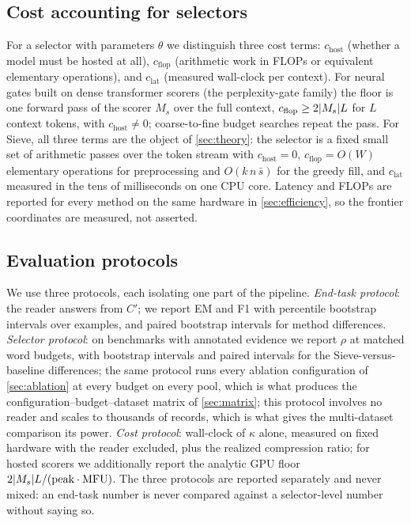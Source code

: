\documentclass[preprint,12pt]{elsarticle}
\DeclarePairedDelimiter\abs{\lvert}{\rvert}
\theoremstyle{remark}
\newcommand{\method}{Sieve}
\begin{document}
\subsection{Cost accounting for selectors}
For a selector with parameters $\theta$ we distinguish three cost
terms: $c_{\mathrm{host}}$ (whether a model must be hosted at all),
$c_{\mathrm{flop}}$ (arithmetic work in FLOPs or equivalent elementary
operations), and $c_{\mathrm{lat}}$ (measured wall-clock per context).
For neural gates built on dense transformer scorers (the
perplexity-gate family) the floor is one forward pass of the scorer
$M_s$ over the full context, $c_{\mathrm{flop}} \ge 2\abs{M_s} L$ for
$L$ context tokens, with $c_{\mathrm{host}} \ne 0$; coarse-to-fine
budget searches repeat the pass. For \method{}, all three terms are the
object of \autoref{sec:theory}: the selector is a fixed small set of
arithmetic passes over the token stream with
$c_{\mathrm{host}} = 0$, $c_{\mathrm{flop}} = O(W)$ elementary
operations for preprocessing and $O(k\,n\,\bar{s})$ for the greedy
fill, and $c_{\mathrm{lat}}$ measured in the tens of milliseconds on
one CPU core. Latency and FLOPs are reported for every method on the
same hardware in \autoref{sec:efficiency}, so the frontier
coordinates are measured, not asserted.

\subsection{Evaluation protocols}
\label{sec:protocols}
We use three protocols, each isolating one part of the pipeline.
\emph{End-task protocol}: the reader answers from $C'$; we report EM
and F1 with percentile bootstrap intervals over examples, and paired
bootstrap intervals for method differences. \emph{Selector protocol}:
on benchmarks with annotated evidence we report $\rho$ at matched word
budgets, with bootstrap intervals and paired intervals for the
\method{}-versus-baseline differences; the same protocol runs every
ablation configuration of \autoref{sec:ablation} at every budget on
every pool, which is what produces the
configuration--budget--dataset matrix of \autoref{sec:matrix}; this
protocol involves no
reader and scales to thousands of records, which is what gives the
multi-dataset comparison its power. \emph{Cost protocol}: wall-clock
of $\kappa$ alone, measured on fixed hardware with the reader
excluded, plus the realized compression ratio; for hosted scorers we
additionally report the analytic GPU floor
$2\abs{M_s} L / (\text{peak} \cdot \mathrm{MFU})$. The three protocols
are reported separately and never mixed: an end-task number is never
compared against a selector-level number without saying so.
\end{document}
